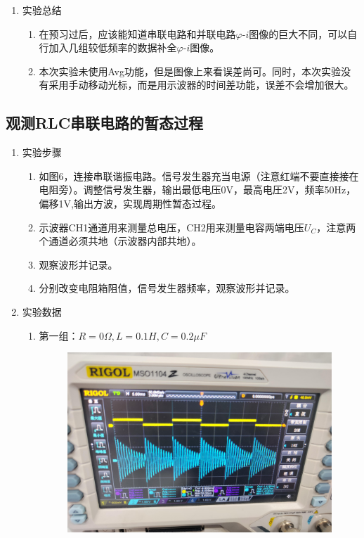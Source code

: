 \documentclass[UTF8]{article}
\begin{document}
\begin{enumerate}
        \item 实验总结
        \begin{enumerate}
            \item 在预习过后，应该能知道串联电路和并联电路$\varphi\text{-}i$图像的巨大不同，可以自行加入几组较低频率的数据补全$\varphi\text{-}i$图像。
            \item 本次实验未使用Avg功能，但是图像上来看误差尚可。同时，本次实验没有采用手动移动光标，而是用示波器的时间差功能，误差不会增加很大。
        \end{enumerate}
\end{enumerate}
\subsection{观测RLC串联电路的暂态过程}
\begin{enumerate}
    \item 实验步骤
    \begin{enumerate}
        \item 如图6，连接串联谐振电路。信号发生器充当电源（注意红端不要直接接在电阻旁）。调整信号发生器，输出最低电压0V，最高电圧2V，频率50Hz，偏移1V,输出方波，实现周期性暂态过程。
        \item 示波器CH1通道用来测量总电压，CH2用来测量电容两端电压$U_C$，注意两个通道必须共地（示波器内部共地）。
        \item 观察波形并记录。
        \item 分别改变电阻箱阻值，信号发生器频率，观察波形并记录。
    \end{enumerate}
    \item 实验数据
    \begin{enumerate}
        \item 第一组：$R=0\Omega,L=0.1H,C=0.2\mu F$
        \begin{figure}[H]
            \centering
            \includegraphics[width=10cm]{Fig/10.jpg}

\end{figure}
\end{enumerate}
\end{enumerate}
\end{document}
